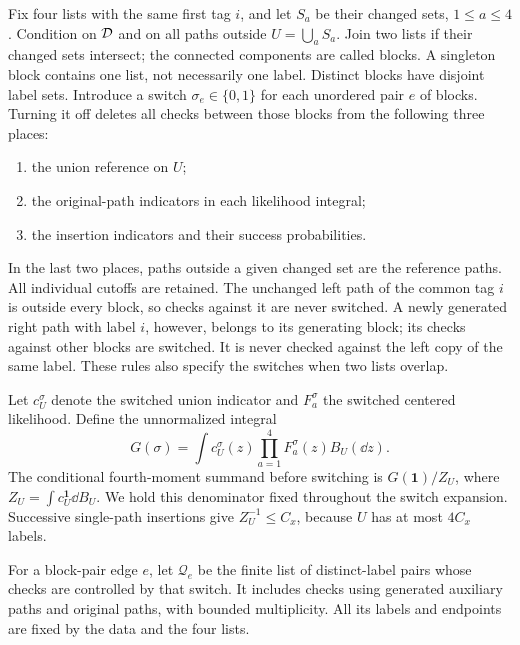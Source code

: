 Fix four lists with the same first tag $i$, and let $S_a$ be their
changed sets, $1\le a\le4$.  Condition on $\mathcal D$ and on all paths
outside $U=\bigcup_aS_a$.  Join two lists if their changed sets
intersect; the connected components are called blocks.  A singleton
block contains one list, not necessarily one label.  Distinct blocks
have disjoint label sets.  Introduce a switch
$\sigma_e\in\{0,1\}$ for each unordered pair $e$ of blocks.
Turning it off deletes all checks between those blocks from the
following three places:
\begin{enumerate}
\item the union reference on $U$;
\item the original-path indicators in each likelihood integral;
\item the insertion indicators and their success probabilities.
\end{enumerate}
In the last two places, paths outside a given changed set are the
reference paths.  All individual cutoffs are retained.  The unchanged
left path of the common tag $i$ is outside every block, so checks
against it are never switched.  A newly generated right path with
label $i$, however, belongs to its generating block; its checks
against other blocks are switched.  It is never checked against the
left copy of the same label.  These rules also specify the switches
when two lists overlap.

Let $c_U^\sigma$ denote the switched union indicator and
$F_a^\sigma$ the switched centered likelihood.  Define the
unnormalized integral
\begin{equation}\label{eq:local-switch-integral}
 G(\sigma)=\int c_U^\sigma(z)
                   \prod_{a=1}^4F_a^\sigma(z)B_U(\dd z).
\end{equation}
The conditional fourth-moment summand before switching is
$G(\boldsymbol1)/Z_U$, where $Z_U=\int c_U^{\boldsymbol1}\dd B_U$.
We hold this denominator fixed throughout the switch expansion.
Successive single-path insertions give $Z_U^{-1}\le C_x$, because
$U$ has at most $4C_x$ labels.

For a block-pair edge $e$, let $\mathcal Q_e$ be the finite list of
distinct-label pairs whose checks are controlled by that switch.
It includes checks using generated auxiliary paths and original
paths, with bounded multiplicity.  All its labels and endpoints are
fixed by the data and the four lists.


